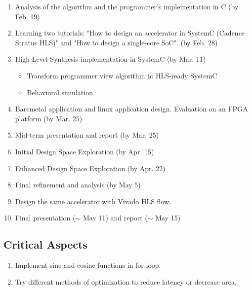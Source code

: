 \documentclass{sig-alternate}
\begin{document}
\vspace{-0.1in}
\begin{enumerate}
\setlength\itemsep{-0.15em}
  \item Analysis of the algorithm and the programmer's implementation in C (by Feb. 19)
  \item Learning two tutorials: "How to design an accelerator in SystemC (Cadence Stratus HLS)" and "How to design a single-core SoC"\cite{esp1}. (by Feb. 28)
  \item High-Level-Synthesis implementation in SystemC (by Mar. 11)
  \vspace{-2mm}
       \begin{itemize}
            \item Transform programmer view algorithm to HLS-ready SystemC
            \item Behavioral simulation
       \end{itemize}

  \item Baremetal application and linux application design. Evaluation on an FPGA platform (by Mar. 25)
  \item Mid-term presentation and report (by Mar. 25)
  \item Initial Design Space Exploration (by Apr. 15)
  \item Enhanced Design Space Exploration (by Apr. 22)
  \item Final refinement and analysis (by May 5)
  \item Design the same accelerator with Vivado HLS flow.
  \item Final presentation ($\sim$ May 11) and report ($\sim$ May 15)
\end{enumerate}

\subsection{Critical Aspects}
\begin{enumerate}
\setlength\itemsep{-0.15em}
\item Implement sine and cosine functions in for-loop.
\item Try different methods of optimization to reduce latency or decrease area.
\end{enumerate}
\end{document}
